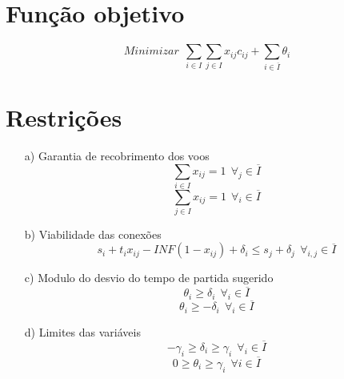 \section{Função objetivo}

\begin{equation}
Minimizar \   \ \sum_{i \in I} \sum_{j \in I} x_{ij}c_{ij} + \sum_{i \in \overline{I}} \theta_{i}
\end{equation}

\section{Restrições}

\begin{enumerate}


\item[a)] Garantia de recobrimento dos voos \\
\begin{equation}
  \sum_{i \in I} x_{ij}= 1 \   \ \forall_{j} \in \overline{I} 
\end{equation}
\begin{equation}
\sum_{j \in I} x_{ij} = 1 \   \ \forall_{i} \in \overline{I}
\end{equation}





\item[b)] Viabilidade das conexões \\
\begin{equation}
s_{i} + t_{i}x_{ij} - INF(1 - x_{ij}) + \delta_{i} \leq s_{j} + \delta_{j} \   \ \forall_{i,j} \in \overline{I}
\end{equation}

\item[c)] Modulo do desvio do tempo de partida sugerido \\
\begin{equation}
\theta_{i} \geq \delta_{i} \   \ \forall_{i} \in \overline{I}
\end{equation}
\begin{equation}
\theta_{i} \geq -\delta_{i} \   \ \forall_{i} \in \overline{I}
\end{equation}

\item[d)] Limites das variáveis \\
\begin{equation}
-\gamma_{i} \geq \delta_{i} \geq \gamma_{i} \   \ \forall_{i} \in \overline{I}
\end{equation}
\begin{equation}
0 \geq \theta_{i} \geq \gamma_{i} \   \ \forall{i} \in \overline{I}
\end{equation}
\end{enumerate}

